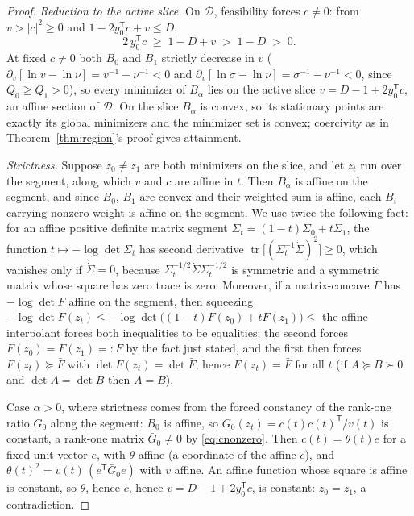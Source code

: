 ﻿\documentclass[11pt,onecolumn]{IEEEtran}
\newcommand{\tr}{\operatorname{tr}}
\begin{document}
\begin{proof}
\emph{Reduction to the active slice.} On $\mathcal D$, feasibility
forces $c\ne0$: from $v>|c|^2\ge0$ and
$1-2y_0^{\mathsf T}c+v\le D$,
\begin{equation}
2\,y_0^{\mathsf T}c\;\ge\;1-D+v\;>\;1-D\;>\;0 .
\label{eq:cnonzero}
\end{equation}
At fixed $c\ne0$ both $B_0$ and $B_1$ strictly decrease in $v$
($\partial_v[\ln v-\ln \nu]=v^{-1}-\nu^{-1}<0$ and
$\partial_v[\ln\sigma-\ln \nu]=\sigma^{-1}-\nu^{-1}<0$, since
$Q_0\ge Q_1>0$), so every minimizer of $B_\alpha$ lies on the active
slice $v=D-1+2y_0^{\mathsf T}c$, an affine section of $\mathcal D$. On
the slice $B_\alpha$ is convex, so its stationary points are exactly
its global minimizers and the minimizer set is convex; coercivity as
in Theorem~\ref{thm:region}'s proof gives attainment.

\emph{Strictness.} Suppose $z_0\ne z_1$ are both minimizers on the
slice, and let $z_t$ run over the segment, along which $v$ and $c$ are
affine in $t$. Then $B_\alpha$ is affine on the segment, and since
$B_0$, $B_1$ are convex and their weighted sum is affine, each $B_i$
carrying nonzero weight is affine on the segment. We use twice the
following fact: for an affine positive definite matrix segment
$\Sigma_t=(1-t)\Sigma_0+t\Sigma_1$, the function
$t\mapsto-\log\det\Sigma_t$ has second derivative
$\tr\bigl[(\Sigma_t^{-1}\dot\Sigma)^2\bigr]\ge0$, which vanishes only
if $\dot\Sigma=0$, because
$\Sigma_t^{-1/2}\dot\Sigma\Sigma_t^{-1/2}$ is symmetric and a
symmetric matrix whose square has zero trace is zero. Moreover, if a
matrix-concave $F$ has $-\log\det F$ affine on the segment, then
squeezing
$-\log\det F(z_t)\le-\log\det\bigl((1-t)F(z_0)+tF(z_1)\bigr)\le$
the affine interpolant forces both inequalities to be equalities;
the second forces $F(z_0)=F(z_1)=:\bar F$ by the fact just stated,
and the first then forces $F(z_t)\succeq\bar F$ with
$\det F(z_t)=\det\bar F$, hence $F(z_t)=\bar F$ for all $t$
(if $A\succeq B\succ0$ and $\det A=\det B$ then $A=B$).

Case $\alpha>0$, where strictness comes from the forced constancy of
the rank-one ratio $G_0$ along the segment: $B_0$ is affine, so
$G_0(z_t)=c(t)c(t)^{\mathsf T}/v(t)$ is constant, a rank-one matrix
$\bar G_0\ne0$ by \eqref{eq:cnonzero}. Then $c(t)=\theta(t)e$ for a fixed unit vector
$e$, with $\theta$ affine (a coordinate of the affine $c$), and
$\theta(t)^2=v(t)\,(e^{\mathsf T}\bar G_0e)$ with $v$ affine. An
affine function whose square is affine is constant, so $\theta$, hence
$c$, hence $v=D-1+2y_0^{\mathsf T}c$, is constant: $z_0=z_1$, a
contradiction.


\end{proof}
\end{document}

